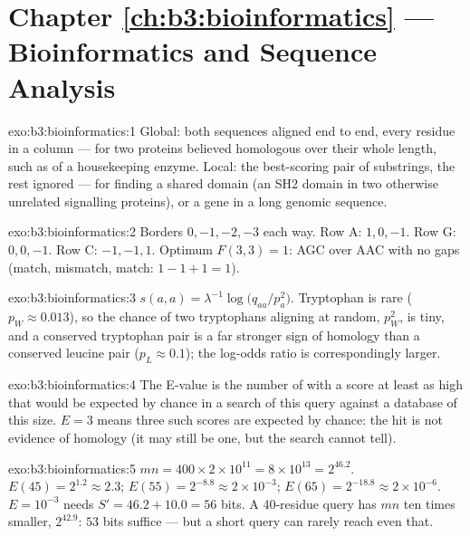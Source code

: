 \section*{Chapter \ref{ch:b3:bioinformatics} --- Bioinformatics and Sequence Analysis}

\begin{solution}{exo:b3:bioinformatics:1}
Global: both sequences aligned end to end, every residue in a column
--- for two proteins believed homologous over their whole length, such
as  of a housekeeping enzyme. Local: the best-scoring pair of
substrings, the rest ignored --- for finding a shared domain (an SH2
domain in two otherwise unrelated signalling proteins), or a gene in a
long genomic sequence.
\end{solution}

\begin{solution}{exo:b3:bioinformatics:2}
Borders $0,-1,-2,-3$ each way. Row A: $1, 0, -1$. Row G: $0, 0, -1$.
Row C: $-1, -1, 1$. Optimum $F(3,3) = 1$: AGC over AAC with no gaps
(match, mismatch, match: $1 - 1 + 1 = 1$).
\end{solution}

\begin{solution}{exo:b3:bioinformatics:3}
$s(a,a) = \lambda^{-1}\log\bigl(q_{aa}/p_{a}^{2}\bigr)$. Tryptophan is
rare ($p_{W} \approx 0.013$), so the chance of two tryptophans aligning
at random, $p_{W}^{2}$, is tiny, and a conserved tryptophan pair is a
far stronger sign of homology than a conserved leucine pair ($p_{L}
\approx 0.1$); the log-odds ratio is correspondingly larger.
\end{solution}

\begin{solution}{exo:b3:bioinformatics:4}
The E-value is the number of  with a score at least as high
that would be expected by chance in a search of this query against a
database of this size. $E = 3$ means three such scores are expected by
chance: the hit is not evidence of homology (it may still be one, but
the search cannot tell).
\end{solution}

\begin{solution}{exo:b3:bioinformatics:5}
$mn = 400\times 2\times 10^{11} = 8\times 10^{13} = 2^{46.2}$. $E(45) =
2^{1.2} \approx 2.3$; $E(55) = 2^{-8.8} \approx 2\times 10^{-3}$;
$E(65) = 2^{-18.8} \approx 2\times 10^{-6}$. $E = 10^{-3}$ needs $S' =
46.2 + 10.0 = 56$ bits. A \num{40}-residue query has $mn$ ten times
smaller, $2^{42.9}$: $53$ bits suffice --- but a short query can rarely
reach even that.
\end{solution}

